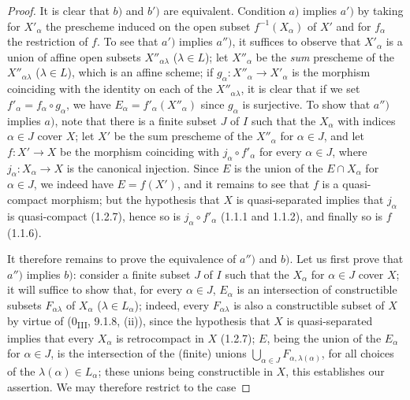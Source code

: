 \begin{proof}
It is clear that $b)$ and $b')$ are equivalent. Condition $a)$ implies
$a')$ by taking for $X'_\alpha$ the prescheme induced on the open subset
$f^{-1}(X_\alpha)$ of $X'$ and for $f_\alpha$ the restriction of $f$. To
see that $a')$ implies $a'')$, it suffices to observe that $X'_\alpha$ is a
union of affine open subsets $X''_{\alpha\lambda}$ ($\lambda\in L$); let
$X''_\alpha$ be the \emph{sum} prescheme of the $X''_{\alpha\lambda}$
($\lambda\in L$), which is an affine scheme; if
$g_\alpha:X''_\alpha\to X'_\alpha$ is the morphism coinciding with
the identity on each of the $X''_{\alpha\lambda}$, it is clear that if we
set $f'_\alpha=f_\alpha\circ g_\alpha$, we have
$E_\alpha=f'_\alpha(X''_\alpha)$ since $g_\alpha$ is surjective. To
show that $a'')$ implies $a)$, note that there is a finite subset $J$ of
$I$ such that the $X_\alpha$ with indices $\alpha\in J$ cover $X$; let
$X'$ be the sum prescheme of the $X''_\alpha$ for $\alpha\in J$, and let
$f:X'\to X$ be the morphism coinciding with $j_\alpha\circ f'_\alpha$ for
every $\alpha\in J$, where $j_\alpha:X_\alpha\to X$ is the canonical
injection. Since $E$ is the union of the $E\cap X_\alpha$ for $\alpha\in J$,
we indeed have $E=f(X')$, and it remains to see that $f$ is a quasi-compact
morphism; but the hypothesis that $X$ is quasi-separated implies that
$j_\alpha$ is quasi-compact (1.2.7), hence so is
$j_\alpha\circ f'_\alpha$ (1.1.1 and 1.1.2), and finally so is $f$ (1.1.6).

It therefore remains to prove the equivalence of $a'')$ and $b)$. Let us
first prove that $a'')$ implies $b)$: consider a finite subset $J$ of $I$
such that the $X_\alpha$ for $\alpha\in J$ cover $X$; it will suffice to
show that, for every $\alpha\in J$, $E_\alpha$ is an intersection of
constructible subsets $F_{\alpha\lambda}$ of $X_\alpha$ ($\lambda\in L_\alpha$);
indeed, every $F_{\alpha\lambda}$ is also a constructible subset of $X$
by virtue of (0\textsubscript{III}, 9.1.8, (ii)), since the hypothesis that
$X$ is quasi-separated implies that every $X_\alpha$ is retrocompact in $X$
(1.2.7); $E$, being the union of the $E_\alpha$ for $\alpha\in J$, is the
intersection of the (finite) unions
$\bigcup_{\alpha\in J}F_{\alpha,\lambda(\alpha)}$, for
all choices of the $\lambda(\alpha)\in L_\alpha$; these unions being
constructible in $X$, this establishes our assertion. We may therefore
restrict to the case



\end{proof}
